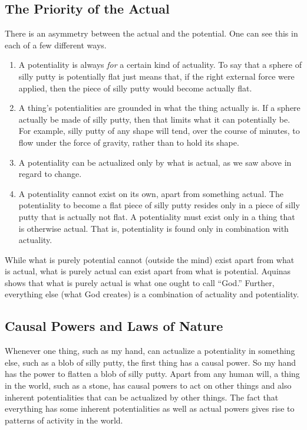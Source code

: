 \documentclass[twocolumn]{article}
\begin{document}
\subsection{The Priority of the Actual}

There is an asymmetry between the actual and the potential.  One can see this
in each of a few different ways.
\begin{enumerate}
   \item A potentiality is always \emph{for} a certain kind of actuality.  To
      say that a sphere of silly putty is potentially flat just means that, if
      the right external force were applied, then the piece of silly putty
      would become actually flat.
   \item A thing's potentialities are grounded in what the thing actually is.
      If a sphere actually be made of silly putty, then that limits what it can
      potentially be.  For example, silly putty of any shape will tend, over
      the course of minutes, to flow under the force of gravity, rather than to
      hold its shape.
   \item A potentiality can be actualized only by what is actual, as we saw
      above in regard to change.
   \item A potentiality cannot exist on its own, apart from something actual.
      The potentiality to become a flat piece of silly putty resides only in a
      piece of silly putty that is actually not flat.  A potentiality must
      exist only in a thing that is otherwise actual.  That is, potentiality is
      found only in combination with actuality.
\end{enumerate}
While what is purely potential cannot (outside the mind) exist apart from what
is actual, what is purely actual can exist apart from what is potential.
Aquinas shows that what is purely actual is what one ought to call ``God.''
Further, everything else (what God creates) is a combination of actuality and
potentiality.

\subsection{Causal Powers and Laws of Nature}

Whenever one thing, such as my hand, can actualize a potentiality in something
else, such as a blob of silly putty, the first thing has a causal power.  So my
hand has the power to flatten a blob of silly putty.  Apart from any human
will, a thing in the world, such as a stone, has causal powers to act on other
things and also inherent potentialities that can be actualized by other things.
The fact that everything has some inherent potentialities as well as actual
powers gives rise to patterns of activity in the world.
\end{document}
